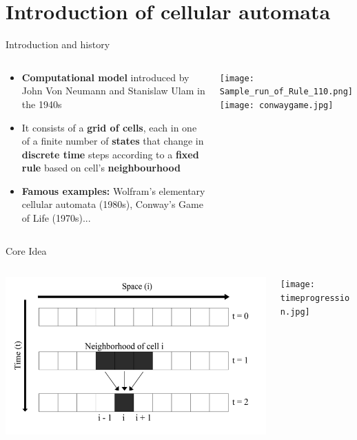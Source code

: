 \section{Introduction of cellular automata}

\begin{frame}{Introduction and history }
 \begin{columns}
     \begin{column}{0.6\textwidth}
          \begin{block}{}

    \begin{itemize}
    \item
    \textbf{Computational model} introduced by John Von Neumann and Stanislaw Ulam in the 1940s
    \item
    It consists of a \textbf{grid of cells}, each in one of a finite number of \textbf{states} that change in \textbf{discrete time} steps according to a \textbf{fixed rule} based on cell's \textbf{neighbourhood}
        \item \textbf{Famous examples:}  Wolfram's elementary cellular automata (1980s), Conway's Game of Life (1970s)...
    \end{itemize}
  \end{block}
     \end{column}
        \centering
        \texttt{[image: Sample\_run\_of\_Rule\_110.png]}
        \texttt{[image: conwaygame.jpg]}
 \end{columns}
\end{frame}


\begin{frame}{Core Idea}

\begin{columns}
    \begin{column}{0.8\textwidth}
                \includegraphics[width = 1.0\textwidth]{slike/intro.png}

    \end{column}
    \begin{column}{0.5\textwidth}
                    \texttt{[image: timeprogression.jpg]}

    \end{column}
\end{columns}

\end{frame}

